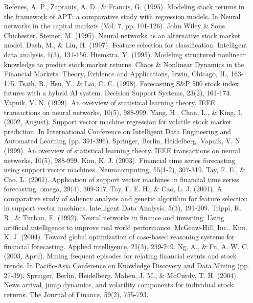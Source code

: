 \documentclass[a4paper,12pt]{report}
\begin{document}
\begin{fig}
\begin{thebibliography}{9}
	Refenes, A. P., Zapranis, A. D., \& Francis, G. (1995). Modeling stock returns in the framework of APT: a comparative study with regression models. In Neural networks in the capital markets (Vol. 7, pp. 101-126). John Wiley \& Sons Chichester.
	Steiner, M. (1995). Neural networks as an alternative stock market model.
	Dash, M., \& Liu, H. (1997). Feature selection for classification. Intelligent data analysis, 1(3), 131-156.
	Hiemstra, Y. (1995). Modeling structured nonlinear knowledge to predict stock market returns. Chaos \& Nonlinear Dynamics in the Financial Markets: Theory, Evidence and Applications, Irwin, Chicago, IL, 163-175.
	Tsaih, R., Hsu, Y., \& Lai, C. C. (1998). Forecasting S\&P 500 stock index futures with a hybrid AI system. Decision Support Systems, 23(2), 161-174.
	Vapnik, V. N. (1999). An overview of statistical learning theory. IEEE transactions on neural networks, 10(5), 988-999.
	Yang, H., Chan, L., \& King, I. (2002, August). Support vector machine regression for volatile stock market prediction. In International Conference on Intelligent Data Engineering and Automated Learning (pp. 391-396). Springer, Berlin, Heidelberg.
	Vapnik, V. N. (1999). An overview of statistical learning theory. IEEE transactions on neural networks, 10(5), 988-999.
	Kim, K. J. (2003). Financial time series forecasting using support vector machines. Neurocomputing, 55(1-2), 307-319.
	Tay, F. E., \& Cao, L. (2001). Application of support vector machines in financial time series forecasting. omega, 29(4), 309-317.
	Tay, F. E. H., \& Cao, L. J. (2001). A comparative study of saliency analysis and genetic algorithm for feature selection in support vector machines. Intelligent Data Analysis, 5(3), 191-209.
	Trippi, R. R., \& Turban, E. (1992). Neural networks in finance and investing: Using artificial intelligence to improve real world performance. McGraw-Hill, Inc..
	Kim, K. J. (2004). Toward global optimization of case-based reasoning systems for financial forecasting. Applied intelligence, 21(3), 239-249.
	Ng, A., \& Fu, A. W. C. (2003, April). Mining frequent episodes for relating financial events and stock trends. In Pacific-Asia Conference on Knowledge Discovery and Data Mining (pp. 27-39). Springer, Berlin, Heidelberg.
	Maheu, J. M., \& McCurdy, T. H. (2004). News arrival, jump dynamics, and volatility components for individual stock returns. The Journal of Finance, 59(2), 755-793.

\end{thebibliography}
\end{fig}
\end{document}
